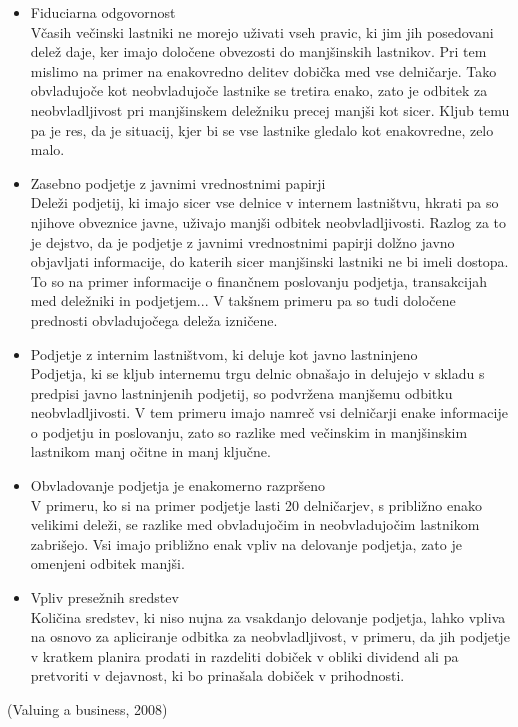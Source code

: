 \documentclass[12pt,a4paper]{amsart}
\theoremstyle{definition} %
\theoremstyle{plain} %
\begin{document}
\begin{itemize}
\item Fiduciarna odgovornost\\
Včasih večinski lastniki ne morejo uživati vseh pravic, ki jim jih posedovani delež daje, ker imajo določene obvezosti do manjšinskih lastnikov. Pri tem mislimo na primer na enakovredno delitev dobička med vse delničarje. Tako obvladujoče kot neobvladujoče lastnike se tretira enako, zato je odbitek za neobvladljivost pri manjšinskem deležniku precej manjši kot sicer. Kljub temu pa je res, da je situacij, kjer bi se vse lastnike gledalo kot enakovredne, zelo malo.
\item Zasebno podjetje z javnimi vrednostnimi papirji\\
Deleži podjetij, ki imajo sicer vse delnice v internem lastništvu, hkrati pa so njihove obveznice javne, uživajo manjši odbitek neobvladljivosti. Razlog za to je dejstvo, da je podjetje z javnimi vrednostnimi papirji dolžno javno objavljati informacije, do katerih sicer manjšinski lastniki ne bi imeli dostopa. To so na primer informacije o finančnem poslovanju podjetja, transakcijah med deležniki in podjetjem... V takšnem primeru pa so tudi določene prednosti obvladujočega deleža izničene.
\item Podjetje z internim lastništvom, ki deluje kot javno lastninjeno\\
Podjetja, ki se kljub internemu trgu delnic obnašajo in delujejo v skladu s predpisi javno lastninjenih podjetij, so podvržena manjšemu odbitku neobvladljivosti. V tem primeru imajo namreč vsi delničarji enake informacije o podjetju in poslovanju, zato so razlike med večinskim in manjšinskim lastnikom manj očitne in manj ključne.
\item Obvladovanje podjetja je enakomerno razpršeno\\
V primeru, ko si na primer podjetje lasti 20 delničarjev, s približno enako velikimi deleži, se razlike med obvladujočim in neobvladujočim lastnikom zabrišejo. Vsi imajo približno enak vpliv na delovanje podjetja, zato je omenjeni odbitek manjši.
\item Vpliv presežnih sredstev\\
Količina sredstev, ki niso nujna za vsakdanjo delovanje podjetja, lahko vpliva na osnovo za apliciranje odbitka za neobvladljivost, v primeru, da jih podjetje v kratkem planira prodati in razdeliti dobiček v obliki dividend ali pa pretvoriti v dejavnost, ki bo prinašala dobiček v prihodnosti.
\end{itemize}
(Valuing a business, 2008)\\
\end{document}
